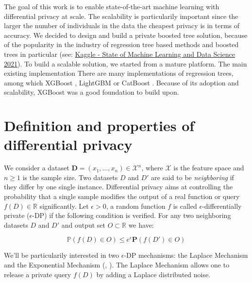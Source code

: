 \documentclass{article}
\theoremstyle{definition}
\begin{document}
The goal of this work is to enable state-of-the-art machine learning with differential privacy at scale.
The scalability is particularily important since the larger the number of individuals in the data the cheapest privacy is
in terms of accuracy. We decided to design and build a private boosted tree solution, because of the popularity in the industry of
regression tree based methods \cite{wu2008top} and boosted trees in particular (see:
\href{https://storage.googleapis.com/kaggle-media/surveys/Kaggle's\%20State\%20of\%20Machine\%20Learning\%20and\%20Data\%20Science\%202021.pdf}{Kaggle - State of Machine Learning and Data Science 2021}). To build a scalable solution, we started from a mature platform. The main existing implementation 
There are many implementations of regression trees, among which XGBoost \cite{chen2016xgboost},
LightGBM \cite{ke2017lightgbm} or CatBoost \cite{prokhorenkova2017catboost}.
Because of its adoption and scalability, XGBoost was a good foundation to build upon.

\section{Definition and properties of differential privacy}

We consider a dataset $\mathbf{D} = (x_1,\dots,x_n)\in \mathcal{X}^n$, where $\mathcal{X}$ is the feature space and $n\geq 1$ is the sample size. 
Two datasets $D$ and $D'$ are said to be \textit{neighboring} if they differ by one single instance. Differential privacy aims at controlling the probability that a 
single sample modifies the output of a real function or query $f(D) \in \mathbb{R}$ significantly. Let $\epsilon > 0$, a random function $f$ is called $\epsilon$-differentially private 
($\epsilon$-DP) if the following condition is verified. For any two neighboring datasets $D$ and $D'$ and output set $O \subset \mathbb{R}$  we have:

\begin{equation*}
  \mathbb{P}\left( f(D) \in O \right) \leq e^{\epsilon} \mathbf{P}\left( f(D') \in O \right) 
\end{equation*}

We'll be particularily interested in two $\epsilon$-DP mechanisms: the Laplace Mechanism and the Exponential Mechanism (\cite{dwork2014}, \cite{mcsherry2007mechanism}). The Laplace Mechanism 
allows one to release a private query $f(D)$ by adding a Laplace distributed noise. 
\end{document}
